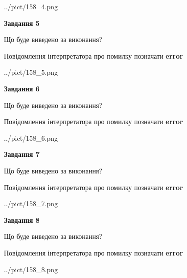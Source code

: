 \documentclass[12pt, ukrainian]{article}
\begin{document}
{\begin{center}
	{../pict/158_4.png}
\end{center}
\newpage

{\begin {center}\textbf{Завдання 5}\end {center}}\par
Що буде виведено за виконання? \par
Повідомлення інтерпретатора про помилку позначати \textbf{error}

\begin{center}
	{../pict/158_5.png}
\end{center}
\newpage

{\begin {center}\textbf{Завдання 6}\end {center}}\par
Що буде виведено за виконання? \par
Повідомлення інтерпретатора про помилку позначати \textbf{error}

\begin{center}
	{../pict/158_6.png}
\end{center}
\newpage

{\begin {center}\textbf{Завдання 7}\end {center}}\par
Що буде виведено за виконання? \par
Повідомлення інтерпретатора про помилку позначати \textbf{error}

\begin{center}
	{../pict/158_7.png}
\end{center}
\newpage

{\begin {center}\textbf{Завдання 8}\end {center}}\par
Що буде виведено за виконання? \par
Повідомлення інтерпретатора про помилку позначати \textbf{error}

\begin{center}
	{../pict/158_8.png}
\end{center}
\newpage

}
\end{document}
